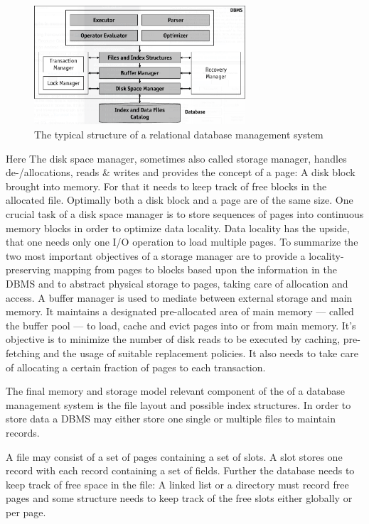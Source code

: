 \documentclass[a4paper,10pt]{article}
\begin{document}
\begin{figure}[htp]\label{dbms_arch}
 \begin{center}
  \includegraphics[keepaspectratio,width=0.7\textwidth]{img/RDBMS.png}
 \end{center}
 \caption{The typical structure of a relational database management system } %
\end{figure}

Here The disk space manager, sometimes also called storage manager, handles de-/allocations, reads \& writes and provides the concept of a page: A disk block brought into memory. For that it needs to keep track of free blocks in the allocated file. Optimally both a disk block and a page are of the same size. One crucial task of a disk space manager is to store sequences of pages into continuous memory blocks in order to optimize data locality. Data locality has the upside, that one needs only one I/O operation to load multiple pages. To summarize the two most important objectives of a storage manager are to provide a locality-preserving mapping from pages to blocks based upon the information in the DBMS and to abstract physical storage to pages, taking care of allocation and access.
A buffer manager is used to mediate between external storage and main memory. It maintains a designated pre-allocated area of main memory --- called the buffer pool --- to load, cache and evict pages into or from main memory. It's objective is to minimize the number of disk reads to be executed by caching, pre-fetching and the usage of suitable replacement policies. It also needs to take care of allocating a certain fraction of pages to each transaction.

The final memory and storage model relevant component of the  of a database management system is the file layout and possible index structures. 
In order to store data a DBMS may either store one single or multiple files to maintain records. 

A file may consist of a set of pages containing a set of slots. A slot stores one record with each record containing a set of fields. Further the database needs to keep track of free space in the file: A linked list or a directory must record free pages and some structure needs to keep track of the free slots either globally or per page. 
\end{document}
